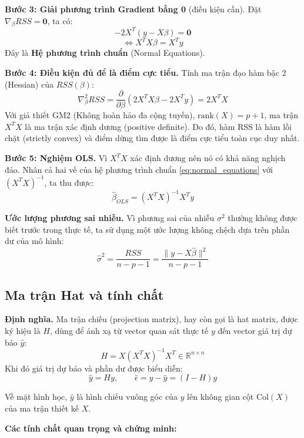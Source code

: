 \documentclass[a4paper]{article}
\begin{document}
\textbf{Bước 3: Giải phương trình Gradient bằng 0} (điều kiện cần).
Đặt $\nabla_{\beta}RSS = \mathbf{0}$, ta có:
$$-2X^T(y - X\beta) = \mathbf{0}$$
\begin{equation}\label{eq:normal_equations}
\iff X^TX\beta = X^Ty
\end{equation}
Đây là \textbf{Hệ phương trình chuẩn} (Normal Equations).

\textbf{Bước 4: Điều kiện đủ để là điểm cực tiểu.}
Tính ma trận đạo hàm bậc 2 (Hessian) của $RSS(\beta)$:
$$\nabla^2_{\beta}RSS = \frac{\partial}{\partial \beta}(2X^TX\beta - 2X^Ty) = 2X^TX$$
Với giả thiết GM2 (Không hoàn hảo đa cộng tuyến), $\text{rank}(X) = p+1$, ma trận $X^TX$ là ma trận xác định dương (positive definite). Do đó, hàm RSS là hàm lồi chặt (strictly convex) và điểm dừng tìm được là điểm cực tiểu toàn cục duy nhất.

\textbf{Bước 5: Nghiệm OLS.}
Vì $X^TX$ xác định dương nên nó có khả năng nghịch đảo. Nhân cả hai vế của hệ phương trình chuẩn \eqref{eq:normal_equations} với $(X^TX)^{-1}$, ta thu được:
\begin{equation}
\hat{\beta}_{OLS} = (X^TX)^{-1}X^Ty
\end{equation}

\textbf{Ước lượng phương sai nhiễu.}
Vì phương sai của nhiễu $\sigma^2$ thường không được biết trước trong thực tế, ta sử dụng một ước lượng không chệch dựa trên phần dư của mô hình:
\begin{equation}
\hat{\sigma}^2 = \frac{RSS}{n - p - 1} = \frac{\lVert y - X\hat{\beta} \rVert^2}{n - p - 1}
\end{equation}

\subsection{Ma trận Hat và tính chất}

\textbf{Định nghĩa.} Ma trận chiếu (projection matrix), hay còn gọi là hat matrix, được ký hiệu là $H$, dùng để ánh xạ từ vector quan sát thực tế $y$ đến vector giá trị dự báo $\hat{y}$:
\begin{equation}
H = X(X^TX)^{-1}X^T \in \mathbb{R}^{n \times n}
\end{equation}
Khi đó giá trị dự báo và phần dư được biểu diễn:
$$\hat{y} = Hy, \qquad \hat{\epsilon} = y - \hat{y} = (I - H)y$$

Về mặt hình học, $\hat{y}$ là hình chiếu vuông góc của $y$ lên không gian cột $\text{Col}(X)$ của ma trận thiết kế $X$.

\textbf{Các tính chất quan trọng và chứng minh:}
\end{document}
